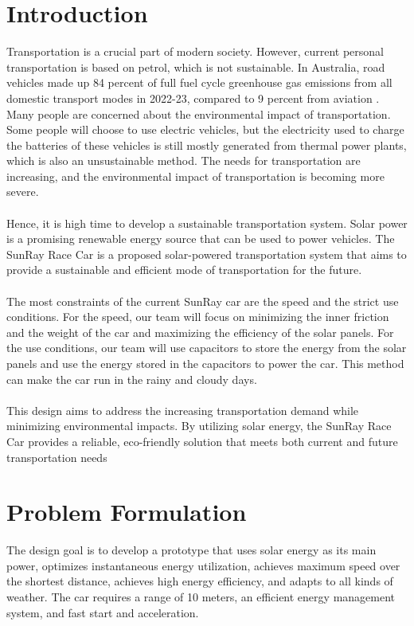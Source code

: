 \documentclass[12pt]{article}
\begin{document}
\section{Introduction}
Transportation is a crucial part of modern society. 
However, current personal transportation is based on petrol, which is not sustainable. 
In Australia, road vehicles made up 84 percent of full fuel cycle greenhouse gas emissions from all domestic transport modes in 2022-23,
compared to 9 percent from aviation \cite{BITRE2023}. 
\newline
\\
Many people are concerned about the environmental impact of transportation.
Some people will choose to use electric vehicles, but the electricity used to charge the batteries of these vehicles is still mostly generated from thermal power plants, 
which is also an unsustainable method. The needs for transportation are increasing, and the environmental impact of transportation is becoming more severe.
\\
\\
Hence, it is high time to develop a sustainable transportation system.
Solar power is a promising renewable energy source that can be used to power vehicles. 
The SunRay Race Car is a proposed solar-powered transportation system that aims to provide a sustainable and efficient mode of transportation for the future.
\\
\\
The most constraints of the current SunRay car are the speed and the strict use conditions. For the speed, our team will focus on minimizing the inner friction and the weight of the car and
maximizing the efficiency of the solar panels. For the use conditions, our team will use capacitors to store the energy from the solar panels and use the energy stored in the capacitors to power the car.
This method can make the car run in the rainy and cloudy days.
\\
\\
This design aims to address the increasing transportation demand while minimizing environmental impacts. 
By utilizing solar energy, the SunRay Race Car provides a reliable, eco-friendly solution that meets both current and future transportation needs
\section{Problem Formulation}
The design goal is to develop a prototype that uses solar energy as its main power, 
optimizes instantaneous energy utilization, achieves maximum speed over the shortest distance, 
achieves high energy efficiency, and adapts to all kinds of weather. 
The car requires a range of 10 meters, an efficient energy management system, and fast start and acceleration. 
\end{document}
